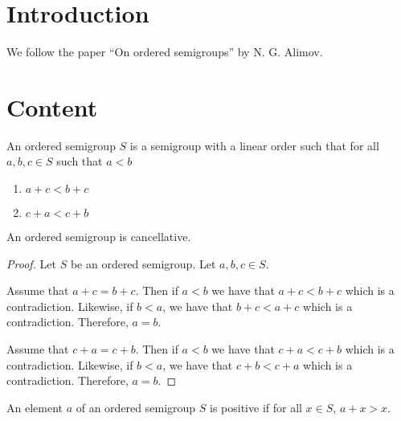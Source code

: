 %

\section{Introduction}
We follow the paper ``On ordered semigroups'' by
N. G. Alimov.

\section{Content}

\begin{definition}\label{OrderedSemigroup}
An ordered semigroup $S$ is a semigroup with a linear order such that
for all $a,b,c\in S$ such that $a < b$
\begin{enumerate}
    \item $a + c < b + c$
    \item $c + a < c + b$
\end{enumerate}
\end{definition}

\begin{theorem}
An ordered semigroup is cancellative.
\end{theorem}
\begin{proof}
Let $S$ be an ordered semigroup. Let $a,b,c\in S$.

Assume that $a + c = b + c$.
Then if $a < b$ we have that $a + c < b + c$ which is a contradiction.
Likewise, if $b < a$, we have that $b + c < a + c$ which is a contradiction.
Therefore, $a = b$.

Assume that $c + a = c + b$.
Then if $a < b$ we have that $c + a < c + b$ which is a contradiction.
Likewise, if $b < a$, we have that $c + b < c + a$ which is a contradiction.
Therefore, $a = b$.
\end{proof}

\begin{definition}
An element $a$ of an ordered semigroup $S$ 
is positive if for all $x\in S$, $a+x > x$.
\end{definition}

